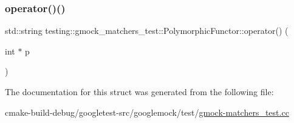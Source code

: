 \mbox{\label{structtesting_1_1gmock__matchers__test_1_1PolymorphicFunctor_afadd033a9ae644f159fff6c14a247a70}} 
\subsubsection{\texorpdfstring{operator()()}{operator()()}\hspace{0.1cm}{\footnotesize\ttfamily [3/3]}}
{\footnotesize\ttfamily std\+::string testing\+::gmock\+\_\+matchers\+\_\+test\+::\+Polymorphic\+Functor\+::operator() (\begin{DoxyParamCaption}\item[{int $\ast$}]{p }\end{DoxyParamCaption})\hspace{0.3cm}{\ttfamily [inline]}}



The documentation for this struct was generated from the following file\+:\begin{DoxyCompactItemize}
\item 
cmake-\/build-\/debug/googletest-\/src/googlemock/test/\mbox{\hyperlink{gmock-matchers__test_8cc}{gmock-\/matchers\+\_\+test.\+cc}}\end{DoxyCompactItemize}
